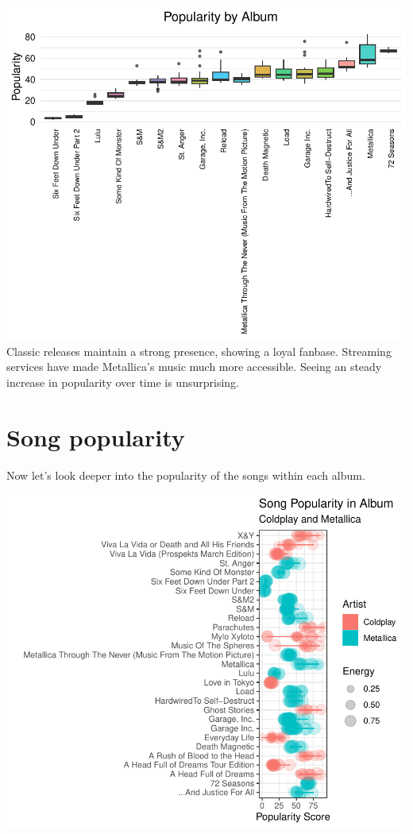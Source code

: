 \documentclass[11pt,preprint]{elsarticle}
\numberwithin{equation}{section}
\numberwithin{figure}{section}
\numberwithin{table}{section}
\begin{document}
\includegraphics{Question2_files/figure-latex/unnamed-chunk-4-1.pdf}
Classic releases maintain a strong presence, showing a loyal fanbase.
Streaming services have made Metallica's music much more accessible.
Seeing an steady increase in popularity over time is unsurprising.
\newpage

\section{Song popularity}\label{song-popularity}

Now let's look deeper into the popularity of the songs within each
album.

\begin{center}\includegraphics[width=0.8\linewidth]{Question2_files/figure-latex/unnamed-chunk-5-1} \end{center}
\end{document}
